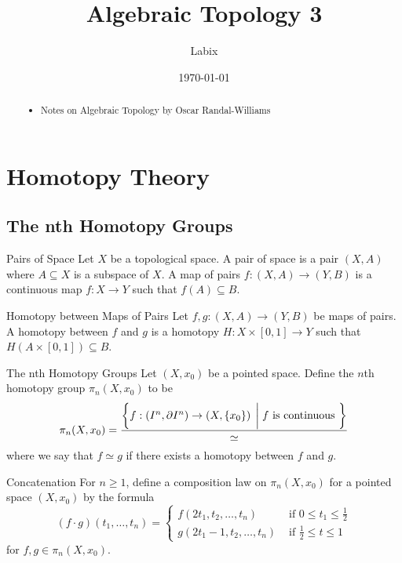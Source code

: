 \documentclass[a4paper]{article}
\title{Algebraic Topology 3}
\author{Labix}
\date{\today}
\begin{document}
\maketitle
\begin{abstract}
\begin{itemize}
\item Notes on Algebraic Topology by Oscar Randal-Williams
\end{itemize}
\end{abstract}
\pagebreak
\tableofcontents

\pagebreak

\section{Homotopy Theory}
\subsection{The nth Homotopy Groups}
\begin{defn}{Pairs of Space}{} Let $X$ be a topological space. A pair of space is a pair $(X,A)$ where $A\subseteq X$ is a subspace of $X$. A map of pairs $f:(X,A)\to(Y,B)$ is a continuous map $f:X\to Y$ such that $f(A)\subseteq B$. 
\end{defn}

\begin{defn}{Homotopy between Maps of Pairs}{} Let $f,g:(X,A)\to (Y,B)$ be maps of pairs. A homotopy between $f$ and $g$ is a homotopy $H:X\times[0,1]\to Y$ such that $H(A\times[0,1])\subseteq B$. 
\end{defn}

\begin{defn}{The nth Homotopy Groups}{} Let $(X,x_0)$ be a pointed space. Define the $n$th homotopy group $\pi_n(X,x_0)$ to be $$\pi_n(X,x_0)=\frac{\left\{f:\left(I^n,\partial I^n\right)\to\left(X,\{x_0\}\right)\;\bigg{|}\;f \text{ is continuous }\right\}}{\simeq}$$ where we say that $f\simeq g$ if there exists a homotopy between $f$ and $g$. 
\end{defn}

\begin{defn}{Concatenation}{} For $n\geq 1$, define a composition law on $\pi_n(X,x_0)$ for a pointed space $(X,x_0)$ by the formula $$(f\cdot g)(t_1,\dots,t_n)=\begin{cases}
f(2t_1,t_2,\dots,t_n) & \text{ if } 0\leq t_1\leq\frac{1}{2}\\
g(2t_1-1,t_2,\dots,t_n) & \text{ if } \frac{1}{2}\leq t\leq 1
\end{cases}$$ for $f,g\in\pi_n(X,x_0)$. 
\end{defn}
\end{document}

